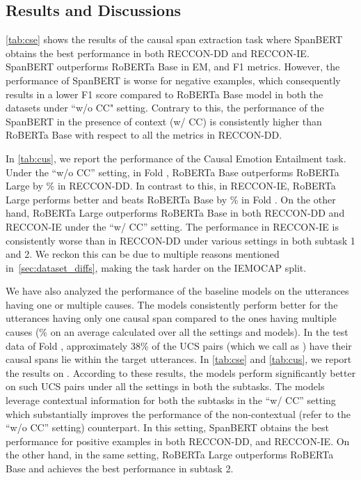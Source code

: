 \documentclass[smallextended]{svjour3}
\newcommand\RECCONDADD{RECCON-DD}
\newcommand\RECCONDAIE{RECCON-IE}
\newcommand\0{\hphantom{0}}
\begin{document}
\subsection{Results and Discussions}
\label{sec:results}
\cref{tab:cse} shows the 
results of the causal span extraction task where SpanBERT obtains the best performance in both \RECCONDADD{} and \RECCONDAIE{}. SpanBERT outperforms RoBERTa Base in EM, and F1 metrics. However, the performance of SpanBERT is worse for negative examples, which consequently results in a lower F1 score compared to RoBERTa Base model in both the datasets under ``w/o CC" setting. Contrary to this, the performance of the SpanBERT in the presence of context (w/ CC) is consistently higher than RoBERTa Base with respect to all the metrics in \RECCONDADD{}.


In \cref{tab:cus}, we report the performance of the Causal Emotion Entailment task. Under the ``w/o CC'' setting, in Fold , RoBERTa Base outperforms RoBERTa Large by \% in \RECCONDADD{}. In contrast to this, in \RECCONDAIE{}, RoBERTa Large performs better and beats RoBERTa Base by \% in Fold . On the other hand, RoBERTa Large outperforms RoBERTa Base in both \RECCONDADD{} and \RECCONDAIE{} under the ``w/ CC'' setting. The performance in \RECCONDAIE{} is consistently worse than in \RECCONDADD{} under various settings in both subtask 1 and 2. We reckon this can be due to multiple reasons mentioned in~\cref{sec:dataset_diffs}, making the task harder on the IEMOCAP split.



We have also analyzed the performance of the baseline models on the utterances having one or multiple causes. The models consistently perform better for the utterances having only one causal span compared to the ones having multiple causes (\% on an average calculated over all the settings and models). In the test data of Fold , approximately 38\% of the UCS pairs (which we call as  ) have their causal spans lie within the target utterances. In \cref{tab:cse} and \ref{tab:cus}, we report the results on . According to these results, the models perform significantly better on such UCS pairs under all the settings in both the subtasks. The models leverage contextual information for both the subtasks in the ``w/ CC'' setting which substantially improves the performance of the non-contextual (refer to the ``w/o CC'' setting) counterpart. In this setting, SpanBERT obtains the best performance for positive examples in both \RECCONDADD{}, and \RECCONDAIE{}. On the other hand, in the same setting, RoBERTa Large outperforms RoBERTa Base and achieves the best performance in subtask 2.
\end{document}
